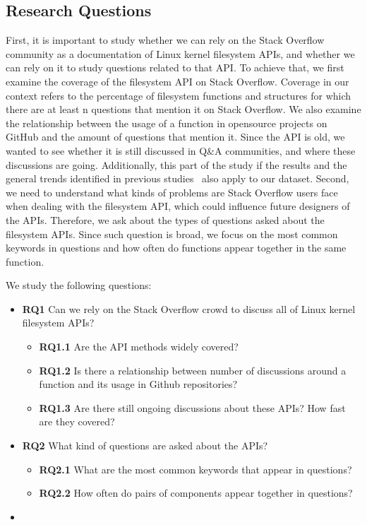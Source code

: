 \subsection{Research Questions}\label{subsec:rq}
First, it is important to study whether we can rely on the Stack Overflow community as a documentation of Linux kernel filesystem APIs, and whether we can rely on it to study questions related to that API. To achieve that, we first examine the coverage of the filesystem API on Stack Overflow. Coverage in our context refers to the percentage of filesystem functions and structures for which there are at least n questions that mention it on Stack Overflow. We also examine the relationship between the usage of a function in opensource projects on GitHub and the amount of questions that mention it. Since the API is old, we wanted to see whether it is still discussed in Q\&A communities, and where these discussions are going. Additionally, this part of the study if the results and the general trends identified in previous studies~\cite{Parnin2012CrowdDE} also apply to our dataset.
Second, we need to understand what kinds of problems are Stack Overflow users face when dealing with the filesystem API, which could influence future designers of the APIs. Therefore, we ask about the types of questions asked about the filesystem APIs. Since such question is broad, we focus on the most common keywords in questions and how often do functions appear together in the same function.

We study the following questions:
\begin{itemize}
  \item
  \textbf{RQ1} Can we rely on the Stack Overflow crowd to discuss all of Linux kernel filesystem APIs?
  \begin{itemize}
    \item
    \textbf{RQ1.1} Are the API methods widely covered?
    \item
    \textbf{RQ1.2} Is there a relationship between number of discussions around a function and its usage in Github repositories?
    \item
    \textbf{RQ1.3} Are there still ongoing discussions about these APIs? How fast are they covered?
  \end{itemize}
  \item
  \textbf{RQ2} What kind of questions are asked about the APIs?
  \begin{itemize}
    \item
    \textbf{RQ2.1} What are the most common keywords that appear in questions?
    \item
    \textbf{RQ2.2} How often do pairs of components appear together in questions?
  \end{itemize}
  \item
\end{itemize}

